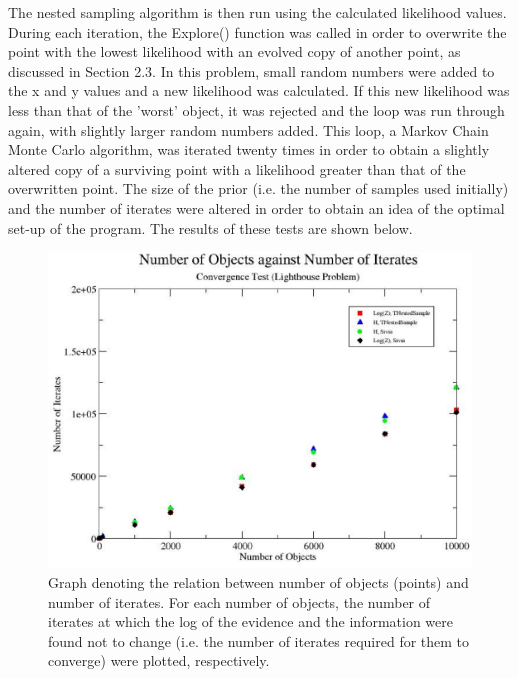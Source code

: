 \documentclass[a4paper,12pt]{article}
\begin{document}
The nested sampling algorithm is then run using the calculated likelihood values.  During each iteration, the Explore() function was called in order to overwrite the point with the lowest likelihood with an evolved copy of another point, as discussed in Section 2.3.  In this problem, small random numbers were added to the x and y values and a new likelihood was calculated.  If this new likelihood was less than that of the 'worst' object, it was rejected and the loop was run through again, with slightly larger random numbers added.  This loop, a Markov Chain Monte Carlo algorithm, was iterated twenty times in order to obtain a slightly altered copy of a surviving point with a likelihood greater than that of the overwritten point. 
\newline
The size of the prior (i.e. the number of samples used initially) and the number of iterates were altered in order to obtain an idea of the optimal set-up of the program.  The results of these tests are shown below.


\begin{figure}[!h]
 \begin{center}
  \includegraphics[scale=0.5]{convergence.eps}
  \caption{Graph denoting the relation between number of objects (points) and number of iterates.  For each number of objects, the number of iterates at which the log of the evidence and the information were found not to change (i.e. the number of iterates required for them to converge) were plotted, respectively.}
 \end{center}
\end{figure}
\end{document}
